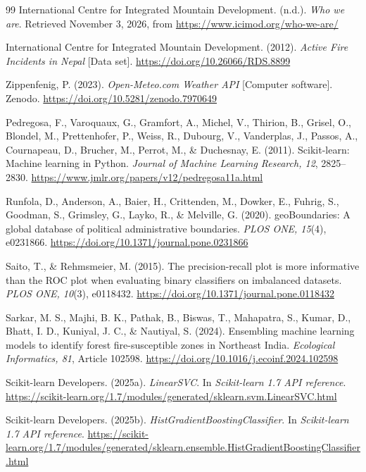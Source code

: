 \begin{thebibliography}{99}
International Centre for Integrated Mountain Development. (n.d.). \textit{Who we are}. Retrieved November 3, 2026, from \url{https://www.icimod.org/who-we-are/}

International Centre for Integrated Mountain Development. (2012). \textit{Active Fire Incidents in Nepal} [Data set]. \url{https://doi.org/10.26066/RDS.8899}

Zippenfenig, P. (2023). \textit{Open-Meteo.com Weather API} [Computer software]. Zenodo. \url{https://doi.org/10.5281/zenodo.7970649}

Pedregosa, F., Varoquaux, G., Gramfort, A., Michel, V., Thirion, B., Grisel, O., Blondel, M., Prettenhofer, P., Weiss, R., Dubourg, V., Vanderplas, J., Passos, A., Cournapeau, D., Brucher, M., Perrot, M., \& Duchesnay, E. (2011). Scikit-learn: Machine learning in Python. \textit{Journal of Machine Learning Research, 12}, 2825--2830. \url{https://www.jmlr.org/papers/v12/pedregosa11a.html}

Runfola, D., Anderson, A., Baier, H., Crittenden, M., Dowker, E., Fuhrig, S., Goodman, S., Grimsley, G., Layko, R., \& Melville, G. (2020). geoBoundaries: A global database of political administrative boundaries. \textit{PLOS ONE, 15}(4), e0231866. \url{https://doi.org/10.1371/journal.pone.0231866}

Saito, T., \& Rehmsmeier, M. (2015). The precision-recall plot is more informative than the ROC plot when evaluating binary classifiers on imbalanced datasets. \textit{PLOS ONE, 10}(3), e0118432. \url{https://doi.org/10.1371/journal.pone.0118432}

Sarkar, M. S., Majhi, B. K., Pathak, B., Biswas, T., Mahapatra, S., Kumar, D., Bhatt, I. D., Kuniyal, J. C., \& Nautiyal, S. (2024). Ensembling machine learning models to identify forest fire-susceptible zones in Northeast India. \textit{Ecological Informatics, 81}, Article 102598. \url{https://doi.org/10.1016/j.ecoinf.2024.102598}

Scikit-learn Developers. (2025a). \textit{LinearSVC}. In \textit{Scikit-learn 1.7 API reference}. \url{https://scikit-learn.org/1.7/modules/generated/sklearn.svm.LinearSVC.html}

Scikit-learn Developers. (2025b). \textit{HistGradientBoostingClassifier}. In \textit{Scikit-learn 1.7 API reference}. \url{https://scikit-learn.org/1.7/modules/generated/sklearn.ensemble.HistGradientBoostingClassifier.html}

\end{thebibliography}
